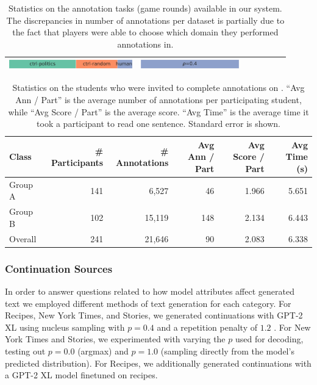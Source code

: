 \begin{table}[tb]
\begin{tabular}{l|r|rr|r|c|c}
\begin{minipage}{.275\textwidth}
      \includegraphics[height=1em]{figures/model_dist_presidential_speeches}
\end{minipage}
&
\begin{minipage}{.225\textwidth}
      \includegraphics[height=1em]{figures/decoding_dist_presidential_speeches}
\end{minipage}
\\
\bottomrule
\end{tabular}
\caption{Statistics on the annotation tasks (game rounds) available in our system. The discrepancies in number of annotations per dataset is partially due to the fact that players were able to choose which domain they performed annotations in.}
\label{tab:dataset_stats}
\end{table}

\begin{table}[tb]
\center
\small
\begin{tabular}{l|rrrrr}
\toprule
Class & \# Participants & \# Annotations & Avg Ann / Part & Avg Score / Part & Avg Time (s)\\
\midrule
Group A & 141 & 6,527 & 46 & 1.966 & {5.651} \\
Group B & 102 & 15,119 & 148 & 2.134 & {6.443} \\
\midrule
Overall & 241 & 21,646 & 90 & 2.083 & {6.338} \\
\bottomrule
\end{tabular}
\caption{Statistics on the students who were invited to complete annotations on \ROFT. ``Avg Ann / Part'' is the average number of annotations per participating student,  while ``Avg Score / Part'' is the average score. ``Avg Time'' is the average time it took a participant to read one sentence. Standard error is shown.
}
\label{tab:particpants}
\end{table}

\subsubsection{Continuation Sources}

In order to answer questions related to how model attributes affect generated text we employed different methods of text generation for each category.
For Recipes, New York Times, and Stories, we generated continuations with GPT-2 XL using nucleus sampling \citep{holtzman2019curious} with $p=0.4$ and a repetition penalty of $1.2$ \citep{keskar2019ctrl}.
For New York Times and Stories, we experimented with varying the $p$ used for decoding, testing out $p=0.0$ (argmax) and $p=1.0$ (sampling directly from the model's predicted distribution).
For Recipes, we additionally generated continuations with a GPT-2 XL model finetuned on recipes.

